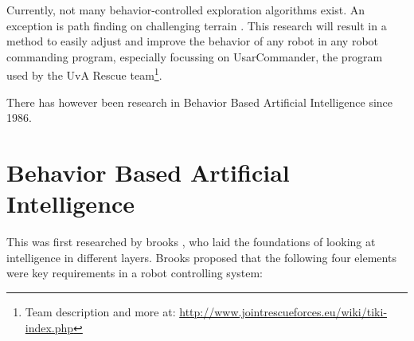 \documentclass[a4paper,10pt]{article}
\begin{document}
%

Currently, not many behavior-controlled exploration algorithms exist.
An exception is path finding on challenging terrain
\cite{seraji2002behavior} . This research will result in a method to
easily adjust and improve the behavior of any robot in any robot commanding
program, especially focussing on UsarCommander, the program used by the UvA Rescue
team\footnote{Team description and more at: \url{http://www.jointrescueforces.eu/wiki/tiki-index.php}}.

There has however been research in Behavior Based Artificial Intelligence since
1986.

\section{Behavior Based Artificial Intelligence}
This was first researched by brooks \cite{brooks1986robust}, who laid the
foundations of looking at intelligence in different layers. Brooks proposed that
the following four elements were key requirements in a robot controlling system:
\end{document}
